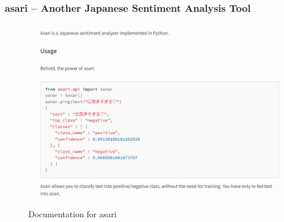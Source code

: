 \documentclass[11pt]{beamer}
\begin{document}
	\begin{frame}
		\frametitle{asari -- Another Japanese Sentiment Analysis Tool}
		\begin{figure}
			\begin{center}
				\includegraphics[scale=0.4]{behold_asari}
			\end{center}
			\caption{Documentation for asari}
		\end{figure}
	\end{frame}
	
\end{document}
